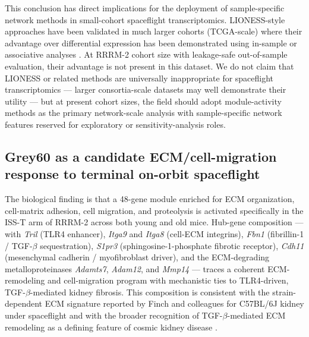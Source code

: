 \documentclass[11pt]{article}
\newcommand{\gene}[1]{\textit{#1}}
\begin{document}
This conclusion has direct implications for the deployment of sample-specific network methods in small-cohort spaceflight transcriptomics. LIONESS-style approaches have been validated in much larger cohorts (TCGA-scale) where their advantage over differential expression has been demonstrated using in-sample or associative analyses \citep{lopes2020gene, fagny2017exploring}. At RRRM-2 cohort size with leakage-safe out-of-sample evaluation, their advantage is not present in this dataset. We do not claim that LIONESS or related methods are universally inappropriate for spaceflight transcriptomics --- larger consortia-scale datasets may well demonstrate their utility --- but at present cohort sizes, the field should adopt module-activity methods as the primary network-scale analysis with sample-specific network features reserved for exploratory or sensitivity-analysis roles.

\subsection{Grey60 as a candidate ECM/cell-migration response to terminal on-orbit spaceflight}

The biological finding is that a 48-gene module enriched for ECM organization, cell-matrix adhesion, cell migration, and proteolysis is activated specifically in the ISS-T arm of RRRM-2 across both young and old mice. Hub-gene composition --- with \gene{Tril} (TLR4 enhancer), \gene{Itga9} and \gene{Itga8} (cell-ECM integrins), \gene{Fbn1} (fibrillin-1 / TGF-$\beta$ sequestration), \gene{S1pr3} (sphingosine-1-phosphate fibrotic receptor), \gene{Cdh11} (mesenchymal cadherin / myofibroblast driver), and the ECM-degrading metalloproteinases \gene{Adamts7}, \gene{Adam12}, and \gene{Mmp14} --- traces a coherent ECM-remodeling and cell-migration program with mechanistic ties to TLR4-driven, TGF-$\beta$-mediated kidney fibrosis. This composition is consistent with the strain-dependent ECM signature reported by Finch and colleagues for C57BL/6J kidney under spaceflight \citep{finch2025strain} and with the broader recognition of TGF-$\beta$-mediated ECM remodeling as a defining feature of cosmic kidney disease \citep{siew2024cosmic, beheshti2018microrna}.
\end{document}
